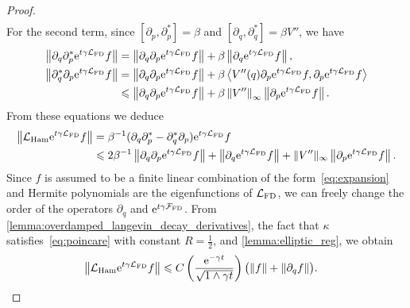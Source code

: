 \documentclass[11pt,a4paper]{article}
\newcommand{\e}{\mathrm{e}}
\newcommand{\commut}[2]{[#1, #2]}
\theoremstyle{plain}
\numberwithin{equation}{section}
\renewcommand{\leq}{\leqslant}
\begin{document}
\begin{proof}
\begin{align}
    \end{align}
    For the second term, since $\commut{\partial_p}{\partial_p^*} = \beta$ and $\commut{\partial_q}{\partial_q^*} = \beta V''$,
    we have
    \begin{align*}
        \norm{\partial_q \partial_p^* \e^{t \gamma \mathcal L_{\rm FD}} f}
        &= \norm{\partial_q \partial_p \e^{t \gamma \mathcal L_{\rm FD}} f} + \beta \norm{\partial_q \e^{t \gamma \mathcal L_{\rm FD}} f}, \\
        \norm{\partial_q^* \partial_p \e^{t \gamma \mathcal L_{\rm FD}} f}
        &= \norm{\partial_q \partial_p \e^{t \gamma \mathcal L_{\rm FD}} f}
        + \beta \ip{V''(q) \partial_p \e^{t \gamma \mathcal L_{\rm FD}} f}{\partial_p \e^{t \gamma \mathcal L_{\rm FD}} f} \\
        &\leq \norm{\partial_q \partial_p \e^{t \gamma \mathcal L_{\rm FD}} f}
        + \beta \norm{V''}[\infty] \norm{\partial_p \e^{t \gamma \mathcal L_{\rm FD}} f}.
    \end{align*}
    From these equations we deduce
    \begin{align}
        \notag
        \norm{\mathcal L_{\rm Ham} \e^{t \gamma \mathcal L_{\rm FD}} f}
        &= \beta^{-1} (\partial_q \partial_p^* - \partial_q^* \partial_p) \e^{t \gamma \mathcal L_{\rm FD}} f \\
        \label{eq:reasoning_action_lham}
        &\leq 2 \beta^{-1} \norm{\partial_q \partial_p \e^{t \gamma \mathcal L_{\rm FD}} f}
        + \norm{\partial_q \e^{t \gamma \mathcal L_{\rm FD}} f}
        + \norm*{V''}[\infty] \norm{\partial_p \e^{t \gamma \mathcal L_{\rm FD}} f}.
    \end{align}
    Since $f$ is assumed to be a finite linear combination of the form~\eqref{eq:expansion} and
    Hermite polynomials are the eigenfunctions of $\mathcal L_{\rm FD}$,
    we can freely change the order of the operators $\partial_q$ and $\e^{t \gamma \mathcal F_{\rm FD}}$.
    From \cref{lemma:overdamped_langevin_decay_derivatives}, the fact that $\kappa$ satisfies~\eqref{eq:poincare} with constant $R = \frac{1}{2}$,
    and \cref{lemma:elliptic_reg},
    we obtain
    \begin{align}
        \label{eq:bound_action_lham}
        \norm{\mathcal L_{\rm Ham} \e^{t \gamma \mathcal L_{\rm FD}} f}
        &\leq C \left( \frac{\e^{-\gamma t}}{\sqrt{1 \wedge \gamma t}} \right) \bigl( \norm{f} + \norm{\partial_q f} \bigr).

\end{align}
\end{proof}
\end{document}
